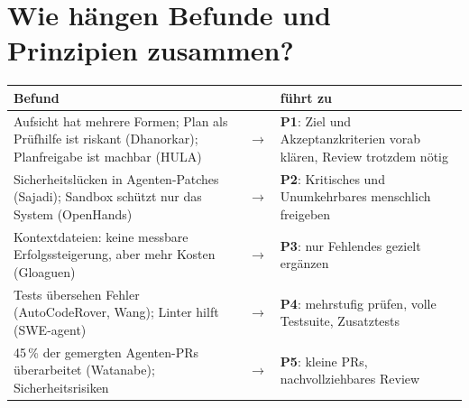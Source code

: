\documentclass[11pt,a4paper,parskip=half]{scrartcl}
\begin{document}
\section{Wie hängen Befunde und Prinzipien zusammen?}
\begin{center}\small
\begin{tabularx}{\textwidth}{@{}LcL@{}}
\toprule
\textbf{Befund} & & \textbf{führt zu} \\
\midrule
Aufsicht hat mehrere Formen; Plan als Prüfhilfe ist riskant (Dhanorkar); Planfreigabe ist machbar (HULA) & \(\rightarrow\) & \textbf{P1}: Ziel und Akzeptanzkriterien vorab klären, Review trotzdem nötig \\
Sicherheitslücken in Agenten-Patches (Sajadi); Sandbox schützt nur das System (OpenHands) & \(\rightarrow\) & \textbf{P2}: Kritisches und Unumkehrbares menschlich freigeben \\
Kontextdateien: keine messbare Erfolgssteigerung, aber mehr Kosten (Gloaguen) & \(\rightarrow\) & \textbf{P3}: nur Fehlendes gezielt ergänzen \\
Tests übersehen Fehler (AutoCodeRover, Wang); Linter hilft (SWE-agent) & \(\rightarrow\) & \textbf{P4}: mehrstufig prüfen, volle Testsuite, Zusatztests \\
45\,\% der gemergten Agenten-PRs überarbeitet (Watanabe); Sicherheitsrisiken & \(\rightarrow\) & \textbf{P5}: kleine PRs, nachvollziehbares Review \\
\bottomrule
\end{tabularx}
\end{center}

\end{document}
